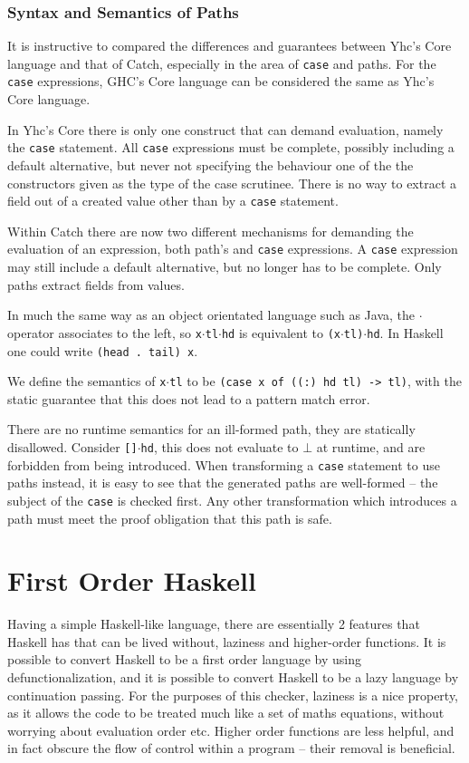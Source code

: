 \documentclass[preprint]{sigplanconf}
\newcommand{\T}[1]{\texttt{#1}}
\newcommand{\D}{\ensuremath{\cdot}} %
\begin{document}
\subsubsection{Syntax and Semantics of Paths}

It is instructive to compared the differences and guarantees between Yhc's Core
language and that of Catch, especially in the area of \T{case} and paths. For
the \T{case} expressions, GHC's Core language can be considered the same as
Yhc's Core language.

In Yhc's Core there is only one construct that can demand evaluation, namely
the \T{case} statement. All \T{case} expressions must be complete, possibly
including a default alternative, but never not specifying the behaviour one of
the the constructors given as the type of the case scrutinee. There is no way
to extract a field out of a created value other than by a \T{case} statement.

Within Catch there are now two different mechanisms for demanding the
evaluation of an expression, both path's and \T{case} expressions. A \T{case}
expression may still include a default alternative, but no longer has to be
complete. Only paths extract fields from values.

In much the same way as an object orientated language such as Java, the \D{}
operator associates to the left, so \T{x\D{}tl\D{}hd} is equivalent to
\T{(x\D{}tl)\D{}hd}. In Haskell one could write \T{(head . tail) x}.

We define the semantics of \T{x\D{}tl} to be \T{(case x of ((:) hd tl) -> tl)},
with the static guarantee that this does not lead to a pattern match error.

There are no runtime semantics for an ill-formed path, they are statically
disallowed. Consider \T{[]\D{}hd}, this does not evaluate to $\bot{}$ at
runtime, and are forbidden from being introduced. When transforming a \T{case}
statement to use paths instead, it is easy to see that the generated paths are
well-formed -- the subject of the \T{case} is checked first. Any other
transformation which introduces a path must meet the proof obligation that this
path is safe.

\section{First Order Haskell}
\label{chap:defunc}

Having a simple Haskell-like language, there are essentially 2 features that
Haskell has that can be lived without, laziness and higher-order functions. It
is possible to convert Haskell to be a first order language by using
defunctionalization, and it is possible to convert Haskell to be a lazy
language by continuation passing. For the purposes of this checker, laziness is
a nice property, as it allows the code to be treated much like a set of maths
equations, without worrying about evaluation order etc. Higher order functions
are less helpful, and in fact obscure the flow of control within a program --
their removal is beneficial.
\end{document}
